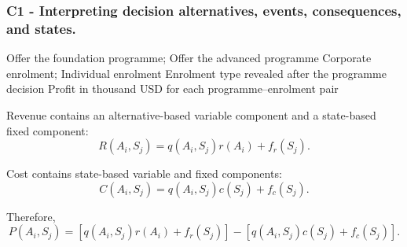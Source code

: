	\subsubsection*{C1 - Interpreting decision alternatives, events, consequences, and states.}
	\label{subsec:problem11-online-training-programme-c1}

	\DecisionElementsTable
	{Offer the foundation programme; Offer the advanced programme}
	{Corporate enrolment; Individual enrolment}
	{Enrolment type revealed after the programme decision}
	{Profit in thousand USD for each programme--enrolment pair}

	Revenue contains an alternative-based variable component and a state-based
	fixed component:
	\[
	R(A_i,S_j)
	=
	q(A_i,S_j)r(A_i)+f_r(S_j).
	\]

	Cost contains state-based variable and fixed components:
	\[
	C(A_i,S_j)
	=
	q(A_i,S_j)c(S_j)+f_c(S_j).
	\]

	Therefore,
	\[
	P(A_i,S_j)
	=
	\left[
	q(A_i,S_j)r(A_i)+f_r(S_j)
	\right]
	-
	\left[
	q(A_i,S_j)c(S_j)+f_c(S_j)
	\right].
	\]


